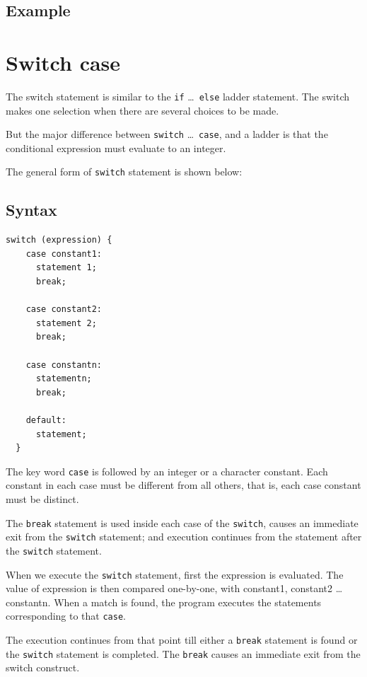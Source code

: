 \documentclass[11pt,a4paper]{article}
\begin{document}
\subsection*{Example}
 


\section*{Switch case}  
The switch statement is similar to the \lstinline!if! \ldots ~\lstinline!else! ladder statement. The switch makes one selection when there are several choices to be made. 

But the major difference between \lstinline!switch! \ldots ~\lstinline!case!, and a ladder is that the conditional expression must evaluate to an integer.

The general form of \lstinline!switch! statement is shown below:

\subsection*{Syntax}

\begin{lstlisting}[numbers=none]
  switch (expression) {
    case constant1:  
      statement 1;
      break;

    case constant2: 
      statement 2;
      break;

    case constantn: 
      statementn;
      break;

    default: 
      statement;
  }
\end{lstlisting}

The key word \lstinline!case! is followed by an integer or a character constant. Each constant in each case must be different from all others, that is, each case constant must be distinct.

The \lstinline!break! statement is used inside each case of the \lstinline!switch!, causes an immediate exit from the \lstinline!switch! statement; and execution continues from the statement after the \lstinline!switch! statement.

When we execute the \lstinline!switch! statement, first the expression is evaluated. The value of expression is then compared one-by-one, with constant1, constant2 \ldots constantn. When a match is found, the program executes the statements corresponding to that \lstinline!case!. 

The execution continues from that point till either a \lstinline!break! statement is found or the \lstinline!switch! statement is completed. The \lstinline!break! causes an immediate exit from the switch construct.
\end{document}
